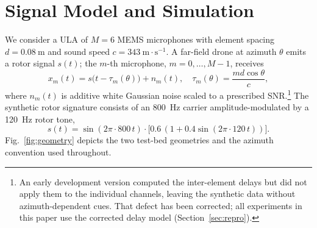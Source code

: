 \documentclass[sensors,article,submit,pdftex,moreauthors]{Definitions/mdpi}
\begin{document}
\section{Signal Model and Simulation}
\label{sec:signal}
We consider a ULA of $M=6$ MEMS microphones with element spacing $d=\SI{0.08}{\meter}$ and sound speed $c=343\ \mathrm{m\cdot s^{-1}}$. A far-field drone at azimuth $\theta$ emits a rotor signal $s(t)$; the $m$-th microphone, $m=0,\dots,M-1$, receives
\begin{equation}
    x_m(t) = s\bigl(t - \tau_m(\theta)\bigr) + n_m(t), \quad \tau_m(\theta)=\frac{m d \cos\theta}{c},
    \label{eq:signal}
\end{equation}
where $n_m(t)$ is additive white Gaussian noise scaled to a prescribed SNR.\footnote{An early development version computed the inter-element delays but did not apply them to the individual channels, leaving the synthetic data without azimuth-dependent cues. That defect has been corrected; all experiments in this paper use the corrected delay model (Section~\ref{sec:repro}).} The synthetic rotor signature consists of an \SI{800}{\hertz} carrier amplitude-modulated by a \SI{120}{\hertz} rotor tone,
\begin{equation}
    s(t)=\sin(2\pi\cdot 800\,t)\cdot\bigl[0.6\,(1+0.4\sin(2\pi\cdot 120\,t))\bigr].
    \label{eq:rotor}
\end{equation}
Fig.~\ref{fig:geometry} depicts the two test-bed geometries and the azimuth convention used throughout.
\end{document}
